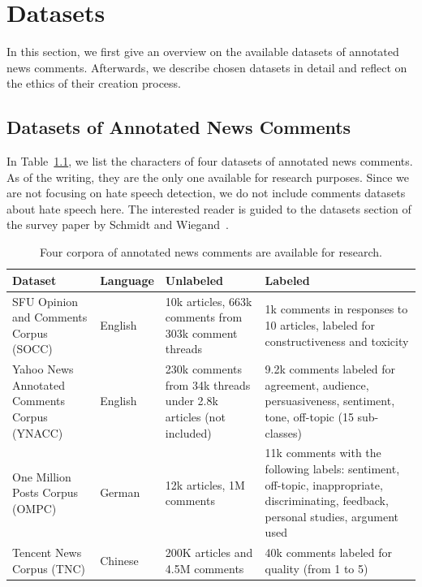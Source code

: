 \chapter{Datasets}
\label{ch:datasets}

In this section, we first give an overview on the available datasets of annotated news comments. Afterwards, we describe chosen datasets in detail and reflect on the ethics of their creation process.

\section{Datasets of Annotated News Comments}
\label{sec:datasets_comments_table}

In Table~\ref{tab:datasets}, we list the characters of four datasets of annotated news comments. As of the writing, they are the only one available for research purposes.
Since we are not focusing on hate speech detection, we do not include comments datasets about hate speech here.
The interested reader is guided to the datasets section of the survey paper by Schmidt and Wiegand~\cite{schmidt2017survey}.

\begin{table}[H]
\small
  \caption{Four corpora of annotated news comments are available for research.}
  \begin{tabular}{| p{3cm} | p{1.5cm} | p{3cm} | p{5.5cm} |}
    \hline
    Dataset & Language & Unlabeled & Labeled \\ \hline
    SFU Opinion and Comments Corpus (SOCC) &  English & 10k articles, 663k comments from 303k comment threads & 1k comments in responses to 10 articles, labeled for constructiveness and toxicity \\ \hline
    Yahoo News Annotated Comments Corpus (YNACC) &  English & 230k comments from 34k threads under 2.8k articles (not included) & 9.2k comments labeled for agreement, audience, persuasiveness, sentiment, tone, off-topic (15 sub-classes)\\ \hline
        One Million Posts Corpus (OMPC) &  German & 12k articles, 1M comments & 11k comments with the following labels: sentiment, off-topic, inappropriate, discriminating, feedback, personal studies, argument used \\ \hline
        Tencent News Corpus (TNC) &  Chinese &  200K articles and 4.5M comments & 40k comments labeled for quality (from 1 to 5) \\ \hline
  \end{tabular}
  \label{tab:datasets}
\end{table}

